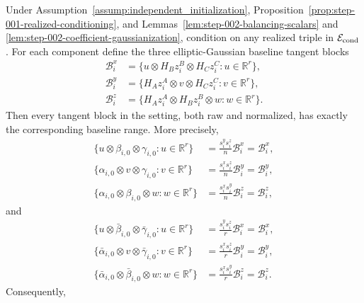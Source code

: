 \begin{proposition}
\label{prop:step-002-balancing-invariance}
Under Assumption~\ref{assump:independent_initialization}, Proposition~\ref{prop:step-001-realized-conditioning}, and
Lemmas~\ref{lem:step-002-balancing-scalars} and
\ref{lem:step-002-coefficient-gaussianization}, condition on any realized
triple in \(\mathcal E_{\rm cond}\). For each component define the three
elliptic-Gaussian baseline tangent blocks
\[
  \begin{aligned}
  \mathcal B_i^x
  &=\{u\otimes H_Bz_i^B\otimes H_Cz_i^C:u\in\mathbb R^r\},\\
  \mathcal B_i^y
  &=\{H_Az_i^A\otimes v\otimes H_Cz_i^C:v\in\mathbb R^r\},\\
  \mathcal B_i^z
  &=\{H_Az_i^A\otimes H_Bz_i^B\otimes w:w\in\mathbb R^r\}.
  \end{aligned}
\]
Then every tangent block in the setting, both raw and normalized, has exactly
the corresponding baseline range. More precisely,
\begin{equation}
  \begin{aligned}
  \{u\otimes\beta_{i,0}\otimes\gamma_{i,0}:u\in\mathbb R^r\}
    &=\frac{s_i^ys_i^z}{n}\mathcal B_i^x=\mathcal B_i^x,\\
  \{\alpha_{i,0}\otimes v\otimes\gamma_{i,0}:v\in\mathbb R^r\}
    &=\frac{s_i^xs_i^z}{n}\mathcal B_i^y=\mathcal B_i^y,\\
  \{\alpha_{i,0}\otimes\beta_{i,0}\otimes w:w\in\mathbb R^r\}
    &=\frac{s_i^xs_i^y}{n}\mathcal B_i^z=\mathcal B_i^z,
  \end{aligned}                                             \label{eq:step-002-3}
\end{equation}
and
\begin{equation}
  \begin{aligned}
  \{u\otimes\bar\beta_{i,0}\otimes\bar\gamma_{i,0}:u\in\mathbb R^r\}
    &=\frac{s_i^ys_i^z}{r}\mathcal B_i^x=\mathcal B_i^x,\\
  \{\bar\alpha_{i,0}\otimes v\otimes\bar\gamma_{i,0}:v\in\mathbb R^r\}
    &=\frac{s_i^xs_i^z}{r}\mathcal B_i^y=\mathcal B_i^y,\\
  \{\bar\alpha_{i,0}\otimes\bar\beta_{i,0}\otimes w:w\in\mathbb R^r\}
    &=\frac{s_i^xs_i^y}{r}\mathcal B_i^z=\mathcal B_i^z.
  \end{aligned}                                             \label{eq:step-002-4}
\end{equation}
Consequently,
\begin{equation}

\end{equation}
\end{proposition}
